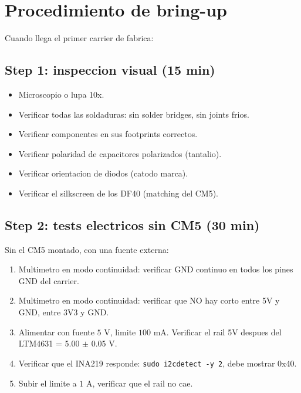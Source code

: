 \documentclass[11pt,a4paper,oneside,openright]{book}
\begin{document}
\chapter{Procedimiento de bring-up}
\label{ch:bringup}

Cuando llega el primer carrier de fabrica:

\section{Step 1: inspeccion visual (15 min)}

\begin{itemize}[leftmargin=2em]
  \item Microscopio o lupa 10x.
  \item Verificar todas las soldaduras: sin solder bridges, sin joints frios.
  \item Verificar componentes en sus footprints correctos.
  \item Verificar polaridad de capacitores polarizados (tantalio).
  \item Verificar orientacion de diodos (catodo marca).
  \item Verificar el silkscreen de los DF40 (matching del CM5).
\end{itemize}

\section{Step 2: tests electricos sin CM5 (30 min)}

Sin el CM5 montado, con una fuente externa:

\begin{enumerate}[leftmargin=2em]
  \item Multimetro en modo continuidad: verificar GND continuo en todos
        los pines GND del carrier.
  \item Multimetro en modo continuidad: verificar que NO hay corto entre
        5V y GND, entre 3V3 y GND.
  \item Alimentar con fuente $5$ V, limite $100$ mA. Verificar el rail
        5V despues del LTM4631 = 5.00 $\pm$ 0.05 V.
  \item Verificar que el INA219 responde:
        \texttt{sudo i2cdetect -y 2}, debe mostrar 0x40.
  \item Subir el limite a $1$ A, verificar que el rail no cae.
\end{enumerate}
\end{document}
